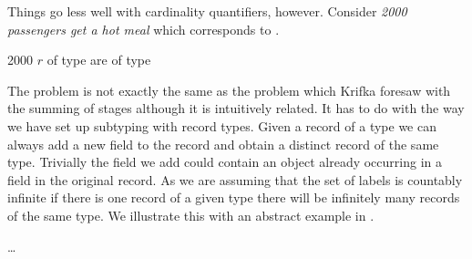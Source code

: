 Things go less well with cardinality quantifiers, however.  Consider
\textit{2000 passengers get a hot meal} which corresponds to
\nexteg{}.
\begin{ex} 
2000 $r$ of type  
are of type   
\end{ex} 
The problem is not exactly the same as the problem which Krifka
foresaw with the summing of stages although it is intuitively
related.  It has to do with the way we have set up subtyping with
record types.  Given a record of a type we can always add a new field
to the record and obtain a distinct record of the same type.
Trivially the field we add could contain an object already occurring
in a field in the original record.  As we
are assuming that the set of labels is countably infinite if there is
one record of a given type there will be infinitely many records of
the same type.  We illustrate this with an abstract example in
\nexteg{}.
\begin{ex} 
\begin{subex} 
 
\item {} 
 
\item {}

\item {}

\item {}

\item \ldots
 
\end{subex} 
   
\end{ex} 
